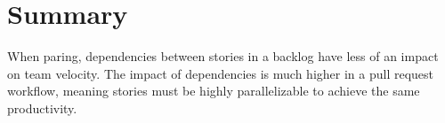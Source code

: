 \documentclass[letterpaper]{article}
\theoremstyle{definition}
\begin{document}
    \section{Summary}\label{sec:summary}

    When paring, dependencies between stories in a backlog have less of an impact on team velocity.
    The impact of dependencies is much higher in a pull request workflow, meaning stories must be highly parallelizable
    to achieve the same productivity.

    
    
\end{document}
